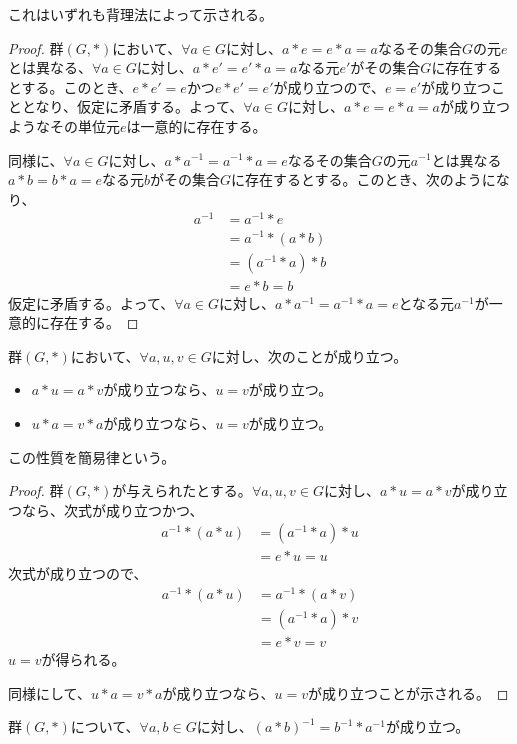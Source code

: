 \documentclass[dvipdfmx]{jsarticle}
\begin{document}
これはいずれも背理法によって示される。
\begin{proof}
群$(G,*)$において、$\forall a \in G$に対し、$a*e = e*a = a$なるその集合$G$の元$e$とは異なる、$\forall a \in G$に対し、$a*e' = e'*a = a$なる元$e'$がその集合$G$に存在するとする。このとき、$e*e' = e$かつ$e*e' = e'$が成り立つので、$e = e'$が成り立つこととなり、仮定に矛盾する。よって、$\forall a \in G$に対し、$a*e = e*a = a$が成り立つようなその単位元$e$は一意的に存在する。\par
同様に、$\forall a \in G$に対し、$a*a^{- 1} = a^{- 1}*a = e$なるその集合$G$の元$a^{- 1}$とは異なる$a*b = b*a = e$なる元$b$がその集合$G$に存在するとする。このとき、次のようになり、
\begin{align*}
a^{- 1} &= a^{- 1}*e\\
&= a^{- 1}*(a*b)\\
&= \left( a^{- 1}*a \right)*b\\
&= e*b = b
\end{align*}
仮定に矛盾する。よって、$\forall a \in G$に対し、$a*a^{- 1} = a^{- 1}*a = e$となる元$a^{- 1}$が一意的に存在する。
\end{proof}
\begin{thm}[簡易律]\label{4.1.1.2}
群$(G,*)$において、$\forall a,u,v \in G$に対し、次のことが成り立つ。
\begin{itemize}
\item
  $a*u = a*v$が成り立つなら、$u = v$が成り立つ。
\item
  $u*a = v*a$が成り立つなら、$u = v$が成り立つ。
\end{itemize}
\par
この性質を簡易律という。
\end{thm}
\begin{proof}
群$(G,*)$が与えられたとする。$\forall a,u,v \in G$に対し、$a*u = a*v$が成り立つなら、次式が成り立つかつ、
\begin{align*}
a^{- 1}*(a*u) &= \left( a^{- 1}*a \right)*u\\
&= e*u = u
\end{align*}
次式が成り立つので、
\begin{align*}
a^{- 1}*(a*u) &= a^{- 1}*(a*v)\\
&= \left( a^{- 1}*a \right)*v\\
&= e*v = v
\end{align*}
$u = v$が得られる。\par
同様にして、$u*a = v*a$が成り立つなら、$u = v$が成り立つことが示される。
\end{proof}
\begin{thm}\label{4.1.1.3}
群$(G,*)$について、$\forall a,b \in G$に対し、$(a*b)^{- 1} = b^{- 1}*a^{- 1}$が成り立つ。
\end{thm}
\end{document}
